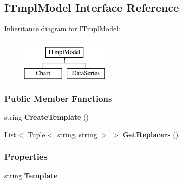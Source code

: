 \hypertarget{interfaceHighcharts_1_1ITmplModel}{}\subsection{I\+Tmpl\+Model Interface Reference}
\label{interfaceHighcharts_1_1ITmplModel}
Inheritance diagram for I\+Tmpl\+Model\+:\begin{figure}[H]
\begin{center}
\leavevmode
\includegraphics[height=2.000000cm]{interfaceHighcharts_1_1ITmplModel}
\end{center}
\end{figure}
\subsubsection*{Public Member Functions}
\begin{DoxyCompactItemize}
\item 
\mbox{\label{interfaceHighcharts_1_1ITmplModel_a8de4430c7a4d26ca3ef2506c1ec4e9e9}} 
string {\bfseries Create\+Template} ()
\item 
\mbox{\label{interfaceHighcharts_1_1ITmplModel_a3d07ca3f01584223ab2ce140b8f14e5e}} 
List$<$ Tuple$<$ string, string $>$ $>$ {\bfseries Get\+Replacers} ()
\end{DoxyCompactItemize}
\subsubsection*{Properties}
\begin{DoxyCompactItemize}
\item 
\mbox{\label{interfaceHighcharts_1_1ITmplModel_a5b6ed5b7cf2b4c06fcab23ae89e90697}} 
string {\bfseries Template}
\end{DoxyCompactItemize}
